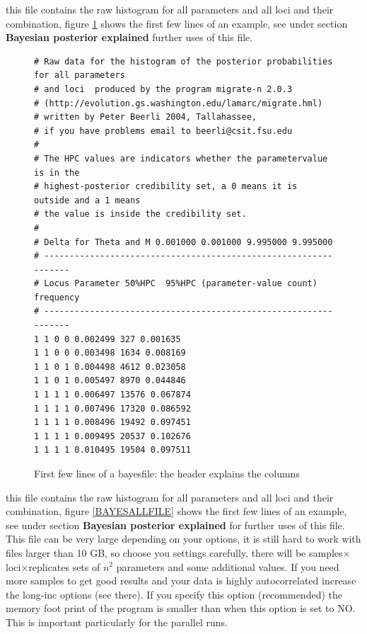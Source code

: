 \begin{description}
\item{} 
this file contains the raw histogram for all parameters and all loci and their combination, figure \ref{BAYESFILE} shows the first few lines of an example, see under section \textbf{Bayesian posterior explained} further uses of this file.
\begin{figure}[bht]

\begin{center}

\begin{boxedminipage}{6in}
\begin{small}
\begin{tt}
\begin{verbatim}
# Raw data for the histogram of the posterior probabilities for all parameters
# and loci  produced by the program migrate-n 2.0.3 
# (http://evolution.gs.washington.edu/lamarc/migrate.hml)
# written by Peter Beerli 2004, Tallahassee, 
# if you have problems email to beerli@csit.fsu.edu
#
# The HPC values are indicators whether the parametervalue is in the 
# highest-posterior credibility set, a 0 means it is outside and a 1 means 
# the value is inside the credibility set.
#
# Delta for Theta and M 0.001000 0.001000 9.995000 9.995000 
# ----------------------------------------------------------------
# Locus Parameter 50%HPC  95%HPC (parameter-value count) frequency
# ----------------------------------------------------------------
1 1 0 0 0.002499 327 0.001635
1 1 0 0 0.003498 1634 0.008169
1 1 0 1 0.004498 4612 0.023058
1 1 0 1 0.005497 8970 0.044846
1 1 1 1 0.006497 13576 0.067874
1 1 1 1 0.007496 17320 0.086592
1 1 1 1 0.008496 19492 0.097451
1 1 1 1 0.009495 20537 0.102676
1 1 1 1 0.010495 19504 0.097511
\end{verbatim}
\end{tt}
\end{small}
\end{boxedminipage}
\end{center}
\caption{{\sf First few lines of a bayesfile: the header explains the columns}}
\label{BAYESFILE}
\end{figure}

\item{}
this file contains the raw histogram for all parameters and all loci and their combination, figure \ref{BAYESALLFILE} shows the first few lines of an example, see under section \textbf{Bayesian posterior explained} for further uses of this file. This file can be very large depending on your options, it is still hard to work with files larger than 10 GB, so choose you settings carefully, there will be samples$\times$loci$\times$replicates sets of $n^2$ parameters and some additional values. If you need more samples to get good results and your data is highly autocorrelated increase the long-inc options (see there). If you specify this option (recommended) the memory foot print of the program is smaller than when this option is set to NO. This is important particularly for the parallel \migrate runs.


\end{description}
